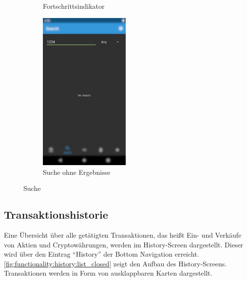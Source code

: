 \documentclass[a4paper]{article}
\begin{document}
\begin{figure}[H]
\begin{subfigure}{.5\textwidth}
		\caption{Fortschrittsindikator}
		\label{fig:functionality:search:loading}
	\end{subfigure}
	\begin{subfigure}{.5\textwidth}
		\centering
		\includegraphics[height=8cm,keepaspectratio]{./images/search/no_results.png}
		\caption{Suche ohne Ergebnisse}
		\label{fig:functionality:search:no-results}
	\end{subfigure}
	\caption{Suche}
	\label{fig:functionality:search}
\end{figure}


\subsection{Transaktionshistorie}
\label{subsec:functionality:history}
Eine Übersicht über alle getätigten Transaktionen, das heißt Ein- und Verkäufe von Aktien und Cryptowährungen, werden im History-Screen dargestellt. Dieser wird über den Eintrag "`History"' der Bottom Navigation erreicht. \autoref{fig:functionality:history:list_closed} zeigt den Aufbau des History-Screens. Transaktionen werden in Form von ausklappbaren Karten dargestellt.
\end{document}
